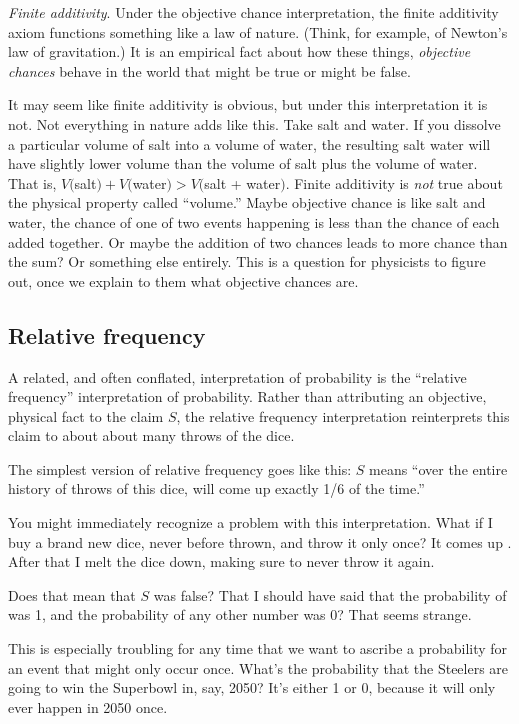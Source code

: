 {\it Finite additivity}.  Under the objective chance interpretation, the finite additivity axiom functions something like a law of nature.  (Think, for example, of Newton's law of gravitation.)  It is an empirical fact about how these things, {\it objective chances} behave in the world that might be true or might be false.

It may seem like finite additivity is obvious, but under this interpretation it is not. Not everything in nature adds like this.  Take salt and water.  If you dissolve a particular volume of salt into a volume of water, the resulting salt water will have slightly lower volume than the volume of salt plus the volume of water.  That is, $V($salt$) + V($water$) > V($salt + water$)$. Finite additivity is {\it not} true about the physical property called ``volume.''  Maybe objective chance is like salt and water, the chance of one of two events happening is less than the chance of each added together. Or maybe the addition of two chances leads to more chance than the sum? Or something else entirely.  This is a question for physicists to figure out, once we explain to them what objective chances are.  

\subsection{Relative frequency}

A related, and often conflated, interpretation of probability is the ``relative frequency'' interpretation of probability.  Rather than attributing an objective, physical fact to the claim $S$, the relative frequency interpretation reinterprets this claim to about about many throws of the dice.

The simplest version of relative frequency goes like this: $S$ means ``over the entire history of throws of this dice,  will come up exactly 1/6 of the time.''  

You might immediately recognize a problem with this interpretation. What if I buy a brand new dice, never before thrown, and throw it only once?  It comes up . After that I melt the dice down, making sure to never throw it again.

Does that mean that $S$ was false?  That I should have said that the probability of  was 1, and the probability of any other number was 0?  That seems strange.  

This is especially troubling for any time that we want to ascribe a probability for an event that might only occur once. What's the probability that the Steelers are going to win the Superbowl in, say, 2050? It's either 1 or 0, because it will only ever happen in 2050 once.


